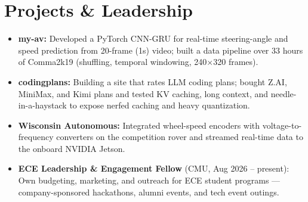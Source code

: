 \documentclass[11pt, letterpaper]{article}
\begin{document}
\section{Projects \& Leadership}
\begin{itemize}
  \item \textbf{my-av:} Developed a PyTorch CNN-GRU for real-time steering-angle and speed prediction from 20-frame (1s) video; built a data pipeline over 33 hours of Comma2k19 (shuffling, temporal windowing, 240$\times$320 frames).
  \item \textbf{codingplans:} Building a site that rates LLM coding plans; bought Z.AI, MiniMax, and Kimi plans and tested KV caching, long context, and needle-in-a-haystack to expose nerfed caching and heavy quantization.
  \item \textbf{Wisconsin Autonomous:} Integrated wheel-speed encoders with voltage-to-frequency converters on the competition rover and streamed real-time data to the onboard NVIDIA Jetson.
  \item \textbf{ECE Leadership \& Engagement Fellow} (CMU, Aug 2026 -- present): Own budgeting, marketing, and outreach for ECE student programs --- company-sponsored hackathons, alumni events, and tech event outings.
\end{itemize}
\end{document}
